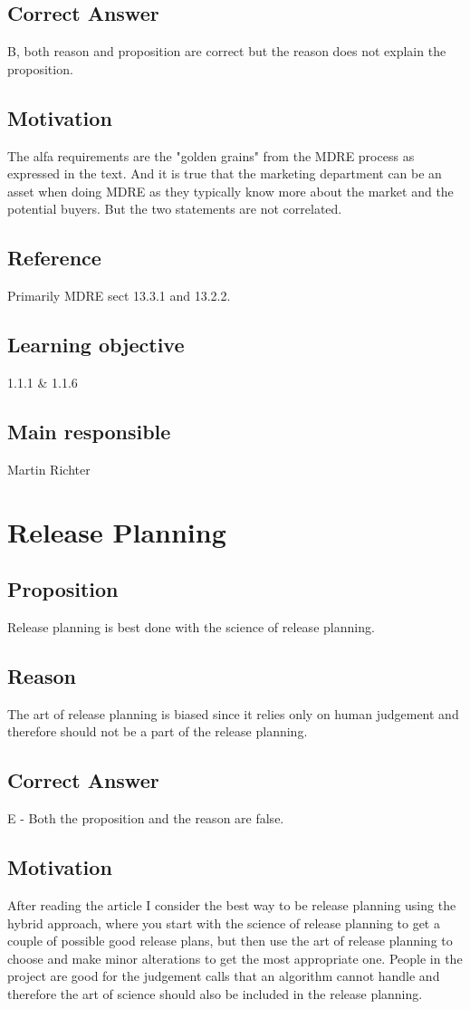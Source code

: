 \documentclass[a4paper]{article}
\begin{document}
\subsection*{Correct Answer}
B, both reason and proposition are correct but the reason does not explain the proposition.
\subsection*{Motivation}
The alfa requirements are the "golden grains" from the MDRE process as expressed in the text. And it is true that the marketing department can be an asset when doing MDRE as they typically know more about the market and the potential buyers. But the two statements are not correlated.
\subsection*{Reference}
Primarily MDRE sect 13.3.1 and 13.2.2.
\subsection*{Learning objective}
1.1.1 \& 1.1.6
\subsection*{Main responsible}
Martin Richter

\section{Release Planning}
\subsection*{Proposition}
Release planning is best done with the science of release planning.
\subsection*{Reason}
The art of release planning is biased since it relies only on human judgement and therefore should not be a part of the release planning.
\subsection*{Correct Answer}
E - Both the proposition and the reason are false.
\subsection*{Motivation}
After reading the article I consider the best way to be release planning using the hybrid approach, where you start with the science of release planning to get a couple of possible good release plans, but then use the art of release planning to choose and make minor alterations to get the most appropriate one. People in the project are good for the judgement calls that an algorithm cannot handle and therefore the art of science should also be included in the release planning. 
\end{document}
